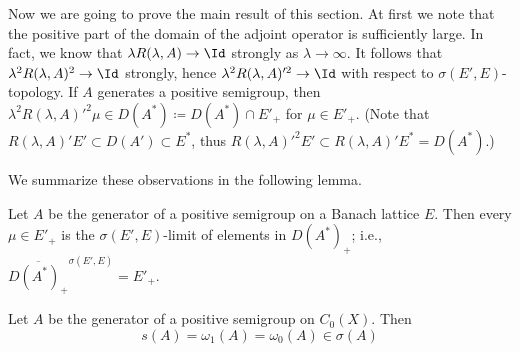 Now we are going to prove the main result of this section. At first we note that the positive part of the domain of the adjoint operator is sufficiently large. In fact, we know that $\lambda R(\lambda,A) \to \Id $ strongly as $\lambda \to \infty$. It follows that $\lambda^2R(\lambda,A)^2 \to \Id $ strongly, hence $\lambda^2R(\lambda,A)'^2 \to \Id $ with respect to $\sigma(E',E)$-topology. If $A$ generates a positive semigroup, then $\lambda^2R(\lambda,A)'^2\mu \in D(A^*) \coloneq D(A^*)\cap E'_+$ for $\mu \in E'_+$. (Note that $R(\lambda,A)'E' \subset D(A') \subset E^*$, thus $R(\lambda,A)'^2E' \subset R(\lambda,A)'E^* = D(A^*)$.)

We summarize these observations in the following lemma.

\begin{lemma}\label{lem:b4-1.3}
Let $A$ be the generator of a positive semigroup on a Banach lattice $E$. Then every $\mu \in E'_+$ is the $\sigma(E',E)$-limit of elements in $D(A^*)_+$; i.e., $\overline{D(A^*)_+}^{\sigma(E',E)} = E'_+$.
\end{lemma}

\begin{theorem}\label{thm:b4-1.4}
Let $A$ be the generator of a positive semigroup on $C_{0}(X)$. Then
\[
   s(A) = \omega_1(A) = \omega_{0}(A) \in \sigma(A)
\]
\end{theorem}

